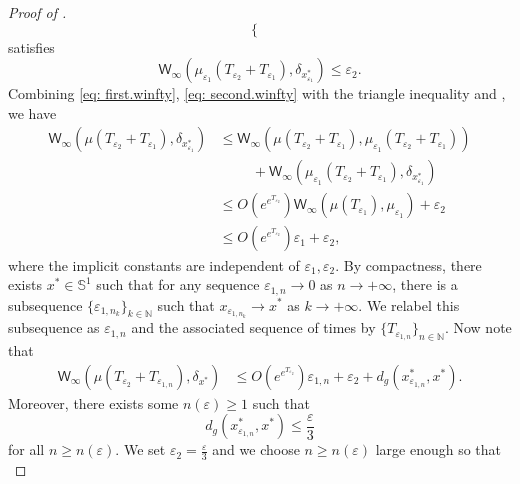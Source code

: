 \documentclass[a4paper,11pt]{article}
\theoremstyle{plain}
\renewcommand{\leq}{\leqslant}
\renewcommand{\geq}{\geqslant}
\numberwithin{equation}{section}
\begin{document}
\begin{proof}[Proof of ]
\begin{equation*}
\begin{cases}
\end{cases}
\end{equation*}
satisfies
\begin{equation} \label{eq: second.winfty}
\mathsf{W}_{\infty}\left(\mu_{\varepsilon_1}(T_{\varepsilon_2}+T_{\varepsilon_1}),\delta_{x^*_{\varepsilon_1}}\right)\leq \varepsilon_2.
\end{equation}
Combining \eqref{eq: first.winfty}, \eqref{eq: second.winfty} with the triangle inequality and , we have
\begin{align*}
\mathsf{W}_\infty\left(\mu(T_{\varepsilon_2}+T_{\varepsilon_1}),\delta_{x^*_{\varepsilon_1}}\right)
&\leq \mathsf{W}_\infty\left(\mu(T_{\varepsilon_2}+T_{\varepsilon_1}),\mu_{\varepsilon_1}(T_{\varepsilon_2}+T_{\varepsilon_1})\right)\\
&\hspace{1cm}+\mathsf{W}_\infty\left(\mu_{\varepsilon_1}(T_{\varepsilon_2}+T_{\varepsilon_1}),\delta_{x^*_{\varepsilon_1}}\right)\\
&\leq O\left(e^{e^{T_{\varepsilon_2}}}\right)\mathsf{W}_\infty\left(\mu(T_{\varepsilon_1}),\mu_{\varepsilon_1}\right)+\varepsilon_2\\
    &\leq O\left(e^{e^{T_{\varepsilon_2}}}\right)\varepsilon_1+\varepsilon_2,
\end{align*}
where the implicit constants are independent of $\varepsilon_1,\varepsilon_2$.
By compactness, there exists $x^*\in\mathbb{S}^1$ such that for any sequence $\varepsilon_{1,n}\to 0$ as $n\to +\infty$, there is a subsequence $\{\varepsilon_{1,n_k}\}_{k\in \mathbb{N}}$ such that $x_{\varepsilon_{1,n_k}}\to x^*$ as $k\to+\infty$. 
We relabel this subsequence as $\varepsilon_{1,n}$ and the associated sequence of times by $\{T_{\varepsilon_{1,n}}\}_{n\in\mathbb{N}}$. 
Now note that
\begin{align}
    \mathsf{W}_{\infty}\left(\mu(T_{\varepsilon_{2}}+T_{\varepsilon_{1,n}}),\delta_{x^*}\right)&\leq O\left(e^{e^{T_{\varepsilon_2}}}\right)\varepsilon_{1,n}+\varepsilon_2+d_g\left(x_{\varepsilon_{1,n}}^*,x^*\right). \label{eq: triangle}
\end{align}
Moreover, there exists some $n(\varepsilon)\geq 1$ such that 
\begin{equation*}
    d_g\left(x_{\varepsilon_{1,n}}^*,x^*\right)\leq \frac{\varepsilon}{3}
\end{equation*}
for all $n\geq n(\varepsilon)$.
We set $\varepsilon_2=\frac{\varepsilon}{3}$ and we choose $n\geq n(\varepsilon)$ large enough so that
\begin{equation*}

\end{equation*}
\end{proof}
\end{document}
